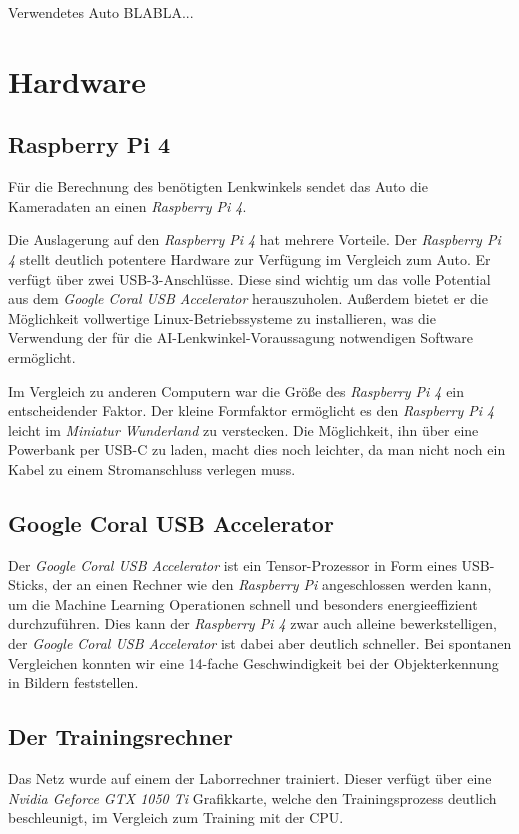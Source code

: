 \documentclass[a4paper, 12pt]{scrartcl}
\begin{document}
	Verwendetes Auto BLABLA...
	\cite{article2}
	

	\section{Hardware}
		\subsection{Raspberry Pi 4}
		Für die Berechnung des benötigten Lenkwinkels sendet das Auto die Kameradaten an einen \emph{Raspberry Pi 4}. 
		
		Die Auslagerung auf den \emph{Raspberry Pi 4} hat mehrere Vorteile. Der \emph{Raspberry Pi 4} stellt deutlich potentere Hardware zur Verfügung im Vergleich zum Auto. Er verfügt über zwei USB-3-Anschlüsse. Diese sind wichtig um das volle Potential aus dem \emph{Google Coral USB Accelerator} herauszuholen. Außerdem bietet er die Möglichkeit vollwertige Linux-Betriebssysteme zu installieren, was die Verwendung der für die AI-Lenkwinkel-Voraussagung notwendigen Software ermöglicht.
		
		Im Vergleich zu anderen Computern war die Größe des \emph{Raspberry Pi 4} ein entscheidender Faktor. Der kleine Formfaktor ermöglicht es den \emph{Raspberry Pi 4} leicht im \emph{Miniatur Wunderland} zu verstecken. Die Möglichkeit, ihn über eine Powerbank per USB-C zu laden, macht dies noch leichter, da man nicht noch ein Kabel zu einem Stromanschluss verlegen muss.
		
		
		\subsection{Google Coral USB Accelerator}
		Der \emph{Google Coral USB Accelerator} ist ein Tensor-Prozessor in Form eines USB-Sticks, der an einen Rechner wie den \emph{Raspberry Pi} angeschlossen werden kann, um die Machine Learning Operationen schnell und besonders energieeffizient durchzuführen. Dies kann der \emph{Raspberry Pi 4} zwar auch alleine bewerkstelligen, der \emph{Google Coral USB Accelerator} ist dabei aber deutlich schneller. Bei spontanen Vergleichen konnten wir eine 14-fache Geschwindigkeit bei der Objekterkennung in Bildern feststellen.

	
		\subsection{Der Trainingsrechner}
		Das Netz wurde auf einem der Laborrechner trainiert. Dieser verfügt über eine \emph{Nvidia Geforce GTX 1050 Ti} Grafikkarte, welche den Trainingsprozess deutlich beschleunigt, im Vergleich zum Training mit der CPU.	
	
\end{document}
